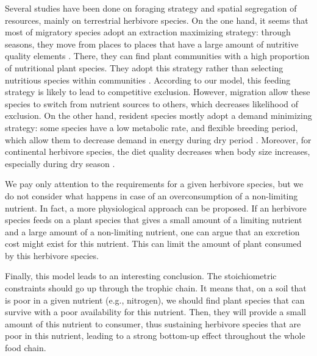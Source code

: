 \documentclass[12pt]{article}
\begin{document}
\par 
Several studies have been done on foraging strategy and spatial segregation of resources, mainly on terrestrial herbivore species. On the one hand, it seems that most of  migratory species adopt an extraction maximizing strategy: through seasons, they move from places to places that have a large amount of nutritive quality elements \citep{Albon1992}. There, they can find plant communities with a high proportion of nutritional plant species. They adopt this strategy rather than selecting nutritious species within communities \citep{Ben-Shahar1992}. According to our model, this feeding strategy is likely to lead to competitive exclusion. However, migration allow these species to switch from nutrient sources to others, which decreases likelihood of exclusion. On the other hand, resident species mostly adopt a demand minimizing strategy: some species have a low metabolic rate, and flexible breeding period, which allow them to decrease demand in energy during dry period \citep{Murray1991}. Moreover, for continental herbivore species, the diet quality decreases when body size increases, especially during dry season \citep{Codron2007}. 
\par
We pay only attention to the requirements for a given herbivore species, but we do not consider what happens in case of an overconsumption of a non-limiting nutrient. In fact, a more physiological approach can be proposed. If an herbivore species feeds on a plant species that gives a small amount of a limiting nutrient and a large amount of a non-limiting nutrient, one can argue that an excretion cost might exist  for this nutrient. This can limit the amount of plant consumed by this herbivore species.
\par 
Finally, this model leads to an interesting conclusion. The stoichiometric constraints should go up through the trophic chain. It means that, on a soil that is poor in a given nutrient (e.g., nitrogen), we should find plant species that can survive with a poor availability  for this nutrient. Then, %
they will provide a small amount of this nutrient to consumer, thus sustaining herbivore species that are poor in this nutrient, leading to a strong bottom-up effect throughout the whole food chain. 
\end{document}
